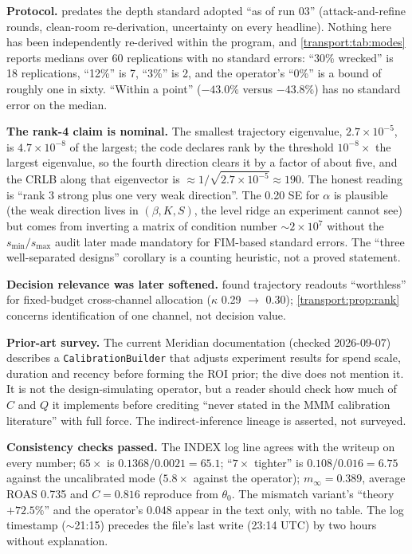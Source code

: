 \begin{reviewernote}[(compiler)]
\textbf{Protocol.}  predates the depth standard adopted ``as of run 03'' (attack-and-refine rounds, clean-room re-derivation, uncertainty on every headline). Nothing here has been independently re-derived within the program, and \cref{transport:tab:modes} reports medians over 60 replications with no standard errors: ``30\% wrecked'' is 18 replications, ``12\%'' is 7, ``3\%'' is 2, and the operator's ``0\%'' is a bound of roughly one in sixty. ``Within a point'' ($-43.0\%$ versus $-43.8\%$) has no standard error on the median.

\textbf{The rank-4 claim is nominal.} The smallest trajectory eigenvalue, $2.7\times10^{-5}$, is $4.7\times10^{-8}$ of the largest; the code declares rank by the threshold $10^{-8}\times$ the largest eigenvalue, so the fourth direction clears it by a factor of about five, and the CRLB along that eigenvector is $\approx 1/\sqrt{2.7\times10^{-5}} \approx 190$. The honest reading is ``rank 3 strong plus one very weak direction''. The 0.20 SE for $\alpha$ is plausible (the weak direction lives in $(\beta, K, S)$, the level ridge an experiment cannot see) but comes from inverting a matrix of condition number $\sim 2\times10^{7}$ without the $s_{\min}/s_{\max}$ audit  later made mandatory for FIM-based standard errors. The ``three well-separated designs'' corollary is a counting heuristic, not a proved statement.

\textbf{Decision relevance was later softened.}  found trajectory readouts ``worthless'' for fixed-budget cross-channel allocation ($\kappa$ 0.29 $\to$ 0.30); \cref{transport:prop:rank} concerns identification of one channel, not decision value.

\textbf{Prior-art survey.} The current Meridian documentation (checked 2026-09-07) describes a \texttt{CalibrationBuilder} that adjusts experiment results for spend scale, duration and recency before forming the ROI prior; the dive does not mention it. It is not the design-simulating operator, but a reader should check how much of $C$ and $Q$ it implements before crediting ``never stated in the MMM calibration literature'' with full force. The indirect-inference lineage is asserted, not surveyed.

\textbf{Consistency checks passed.} The INDEX log line agrees with the writeup on every number; $65\times$ is $0.1368/0.0021 = 65.1$; ``$7\times$ tighter'' is $0.108/0.016 = 6.75$ against the uncalibrated mode ($5.8\times$ against the operator); $m_\infty = 0.389$, average ROAS 0.735 and $C = 0.816$ reproduce from $\theta_0$. The mismatch variant's ``theory $+72.5\%$'' and the operator's 0.048 appear in the text only, with no table. The log timestamp ($\sim$21:15) precedes the file's last write (23:14 UTC) by two hours without explanation.
\end{reviewernote}

